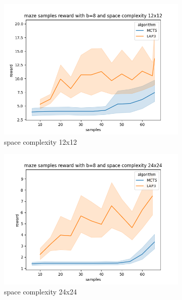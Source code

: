 \documentclass[bibliography=totoc]{scrartcl}
\begin{document}
\begin{figure}[h!]
	\centering
	\begin{subfigure}[b]{0.3\linewidth}
		\includegraphics[width=\linewidth]{img/maze_samples__reward_b_8_LAP3_MCTS_12.png}
        \caption{space complexity 12x12}	
    \end{subfigure}
	\hspace{0.02\textwidth}
	\begin{subfigure}[b]{0.3\linewidth}
		\includegraphics[width=\linewidth]{img/maze_samples__reward_b_8_LAP3_MCTS_24.png}
		\caption{space complexity 24x24}
	\end{subfigure}
	\hspace{0.02\textwidth}
	\begin{subfigure}[b]{0.3\linewidth}

\end{subfigure}
\end{figure}
\end{document}
